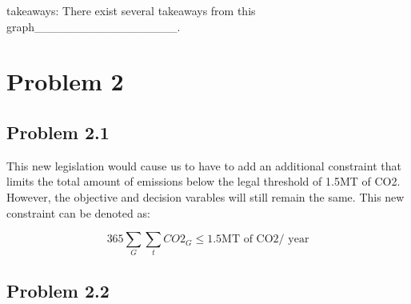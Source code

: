 \documentclass[12pt,a4paper]{article}
\begin{document}
takeaways: There exist several takeaways from this graph\_\_\_\_\_\_\_\_\_\_\_\_\_\_\_\_\_. 

\section{Problem 2}
\subsection{Problem 2.1}
This new legislation would cause us to have to add an additional constraint that limits the total amount of emissions below the legal threshold of 1.5MT of CO2. However,  the objective and decision varables will still remain the same. This new constraint can be denoted as:

\[
365 \sum_G \sum_t CO2_G \ensuremath{\leq} 1.5 \text{MT of CO2/ year}
\]
\subsection{Problem 2.2}
\end{document}
